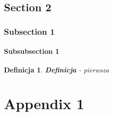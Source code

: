\documentclass[twoside]{iisthesis}
\newtheorem{mydef}{Definicja}
\begin{document}
\section{Section 2}

\subsection{Subsection 1}

\subsubsection{Subsubsection 1}

\begin{mydef}
\textbf{Definicja} - pierwsza
\end{mydef}



 \clearpage
\appendix
\chapter{Appendix 1}


\clearpage
\pagestyle{plain}
\listofmyfigure
\listofmyequations
\listofmyalgorithm
\clearpage




\end{document}
